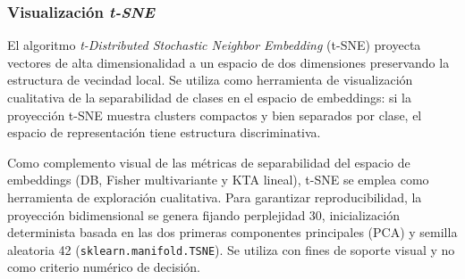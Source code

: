 
\subsubsection{Visualización \textit{t-SNE}}

El algoritmo \textit{t-Distributed Stochastic Neighbor
Embedding} (t-SNE) \cite{vandermaaten2008tsne} proyecta
vectores de alta dimensionalidad a un espacio de dos
dimensiones preservando la estructura de vecindad local.
Se utiliza como herramienta de visualización cualitativa
de la separabilidad de clases en el espacio de embeddings:
si la proyección t-SNE muestra clusters compactos y bien
separados por clase, el espacio de representación tiene
estructura discriminativa.

Como complemento visual de las métricas de separabilidad del espacio de embeddings
(DB, Fisher multivariante y KTA lineal), t-SNE se emplea como herramienta de exploración cualitativa.
Para garantizar reproducibilidad, la proyección bidimensional se genera fijando
perplejidad 30, inicialización determinista basada en las dos primeras componentes principales
(PCA) y semilla aleatoria 42 (\texttt{sklearn.manifold.TSNE}). Se utiliza con fines
de soporte visual y no como criterio numérico de decisión.
